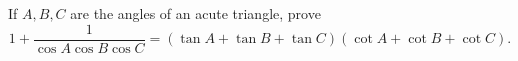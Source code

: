 If $A,B,C$ are the angles of an acute triangle, prove
\[
1+\dfrac{1}{\cos A\cos B\cos C}
=(\tan A+\tan B+\tan C)(\cot A+\cot B+\cot C).
\]
